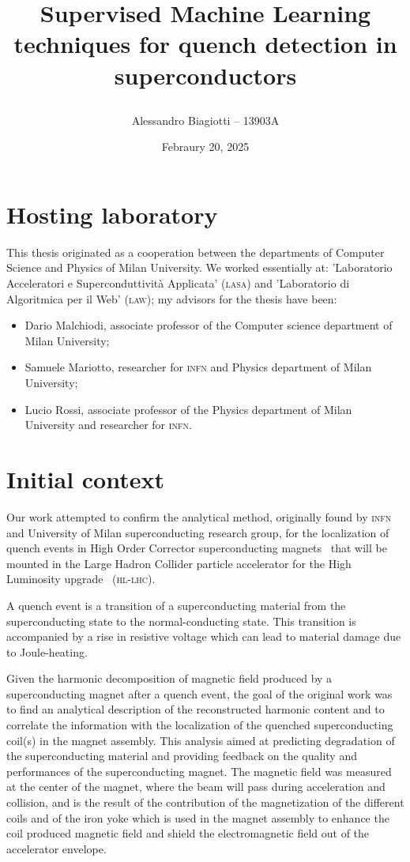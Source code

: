 \documentclass[a4paper, notitlepage]{article}
\title{
	\textsf{Supervised Machine Learning techniques for quench detection in superconductors} \\
	\author{Alessandro Biagiotti -- 13903A}
        \date{Febraury 20, 2025}
}
\begin{document}
\maketitle
\section{Hosting laboratory}
This thesis originated as a cooperation between the departments of Computer Science and Physics of
Milan University. We worked essentially at: 'Laboratorio Acceleratori e Superconduttività Applicata'
(\textsc{lasa}) and 'Laboratorio di Algoritmica per il Web' (\textsc{law}); my advisors for the
thesis have been:
\begin{itemize}
	\item Dario Malchiodi, associate professor of the Computer science department of Milan University;
	\item Samuele Mariotto, researcher for \textsc{infn} and Physics department of Milan
	      University;
	\item Lucio Rossi, associate professor of the Physics department of Milan University and
	      researcher for \textsc{infn}.
\end{itemize}
\section{Initial context}
Our work attempted to confirm the analytical method, originally found by \textsc{infn} and
University of Milan superconducting research group, for the localization of quench events in High
Order Corrector superconducting magnets~\cite{mariotto2022-hoc, mariotto2022-generic} that will be
mounted in the Large Hadron Collider particle accelerator for the High Luminosity upgrade~\cite{rossi2024-hllhc} (\textsc{hl-lhc}).

A quench event is a transition of a superconducting material from the superconducting state to the
normal-conducting state. This transition is accompanied by a rise in resistive voltage which can
lead to material damage due to Joule-heating.

Given the harmonic decomposition of magnetic field produced by a superconducting magnet after a quench event, the goal of the original
work was to find an analytical description of the reconstructed harmonic content and to correlate
the information with the localization of the quenched superconducting coil(s) in the magnet
assembly. This analysis aimed at predicting degradation of the superconducting material and
providing feedback on the quality and performances of the superconducting magnet. The magnetic field
was measured at the center of the magnet, where the beam will pass during acceleration and
collision, and is the result of the contribution of the magnetization of the different coils and of
the iron yoke which is used in the magnet assembly to enhance the coil produced magnetic field and
shield the electromagnetic field out of the accelerator envelope.
\end{document}
